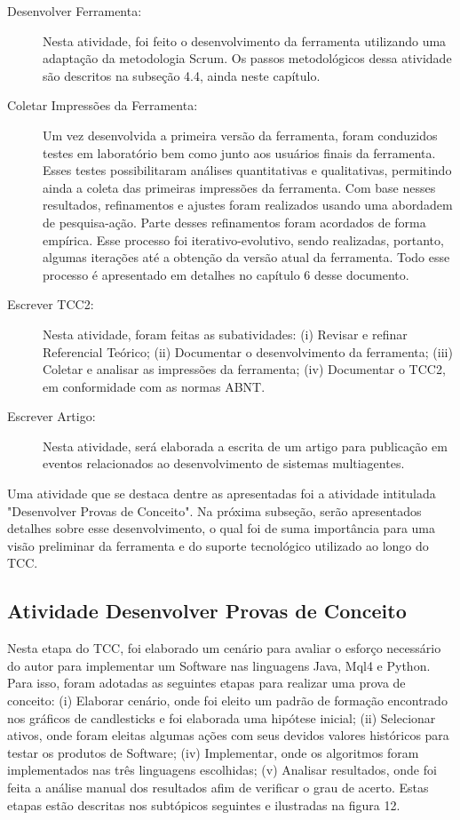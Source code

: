 \begin{description}
\item [Desenvolver Ferramenta:]
Nesta atividade, foi feito o desenvolvimento da ferramenta utilizando uma adaptação da metodologia Scrum. Os passos metodológicos dessa atividade são descritos na subseção 4.4, ainda neste capítulo.

\item [Coletar Impressões da Ferramenta:]
Um vez desenvolvida a primeira versão da ferramenta, foram conduzidos testes em laboratório bem como junto aos usuários finais da ferramenta. Esses testes possibilitaram análises quantitativas e qualitativas, permitindo ainda a coleta das primeiras impressões da ferramenta. Com base nesses resultados, refinamentos e ajustes foram realizados usando uma abordadem de pesquisa-ação. Parte desses refinamentos foram acordados de forma empírica. Esse processo foi iterativo-evolutivo, sendo realizadas, portanto, algumas iterações até a obtenção da versão atual da ferramenta. Todo esse processo é apresentado em detalhes no capítulo 6 desse documento.

\item [Escrever TCC2:] 
Nesta atividade, foram feitas as subatividades: (i) Revisar e refinar Referencial Teórico; (ii) Documentar o desenvolvimento da ferramenta; (iii) Coletar e analisar as impressões da ferramenta; (iv) Documentar o TCC2, em conformidade com as normas ABNT.

\item [Escrever Artigo:]
Nesta atividade, será elaborada a escrita de um artigo para publicação em eventos relacionados ao desenvolvimento de sistemas multiagentes.
\end{description}

Uma atividade que se destaca dentre as apresentadas foi a atividade intitulada "Desenvolver Provas de Conceito".
Na próxima subseção, serão apresentados detalhes sobre esse desenvolvimento, o qual foi de suma importância para uma visão preliminar da ferramenta e do suporte tecnológico utilizado ao longo do TCC.


\subsection{Atividade Desenvolver Provas de Conceito}

Nesta etapa do TCC, foi elaborado um cenário para avaliar o esforço necessário do autor para implementar um Software nas linguagens Java, Mql4 e Python. Para isso, foram adotadas as seguintes etapas para realizar uma prova de conceito: (i) Elaborar cenário, onde foi eleito um padrão de formação encontrado nos gráficos de candlesticks e foi elaborada uma hipótese inicial; (ii) Selecionar  ativos, onde foram eleitas algumas ações com seus devidos valores históricos para testar os produtos de  Software; (iv) Implementar, onde os algoritmos foram implementados nas três linguagens escolhidas; (v) Analisar resultados, onde foi feita a análise manual dos resultados afim de verificar o grau de acerto. Estas etapas estão descritas nos subtópicos seguintes e ilustradas na figura 12.

